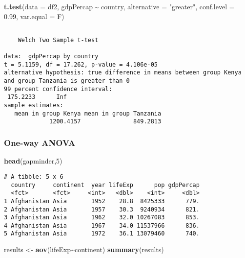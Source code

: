 \documentclass[
]{article}
\newenvironment{Shaded}{\begin{snugshade}}{\end{snugshade}}
\newcommand{\AttributeTok}[1]{\textcolor[rgb]{0.13,0.29,0.53}{#1}}
\newcommand{\DecValTok}[1]{\textcolor[rgb]{0.00,0.00,0.81}{#1}}
\newcommand{\FloatTok}[1]{\textcolor[rgb]{0.00,0.00,0.81}{#1}}
\newcommand{\FunctionTok}[1]{\textcolor[rgb]{0.13,0.29,0.53}{\textbf{#1}}}
\newcommand{\NormalTok}[1]{#1}
\newcommand{\OtherTok}[1]{\textcolor[rgb]{0.56,0.35,0.01}{#1}}
\newcommand{\SpecialCharTok}[1]{\textcolor[rgb]{0.81,0.36,0.00}{\textbf{#1}}}
\newcommand{\StringTok}[1]{\textcolor[rgb]{0.31,0.60,0.02}{#1}}
\begin{document}
\begin{Shaded}
\begin{Highlighting}[]
\FunctionTok{t.test}\NormalTok{(}\AttributeTok{data =}\NormalTok{ df2, gdpPercap }\SpecialCharTok{\textasciitilde{}}\NormalTok{ country, }\AttributeTok{alternative =} \StringTok{"greater"}\NormalTok{, }\AttributeTok{conf.level =} \FloatTok{0.99}\NormalTok{, }\AttributeTok{var.equal =}\NormalTok{ F)}
\end{Highlighting}
\end{Shaded}

\begin{verbatim}

    Welch Two Sample t-test

data:  gdpPercap by country
t = 5.1159, df = 17.262, p-value = 4.106e-05
alternative hypothesis: true difference in means between group Kenya and group Tanzania is greater than 0
99 percent confidence interval:
 175.2233      Inf
sample estimates:
   mean in group Kenya mean in group Tanzania 
             1200.4157               849.2813 
\end{verbatim}

\hypertarget{one-way-anova}{%
\subsubsection{One-way ANOVA}\label{one-way-anova}}

\begin{Shaded}
\begin{Highlighting}[]
\FunctionTok{head}\NormalTok{(gapminder,}\DecValTok{5}\NormalTok{)}
\end{Highlighting}
\end{Shaded}

\begin{verbatim}
# A tibble: 5 x 6
  country     continent  year lifeExp      pop gdpPercap
  <fct>       <fct>     <int>   <dbl>    <int>     <dbl>
1 Afghanistan Asia       1952    28.8  8425333      779.
2 Afghanistan Asia       1957    30.3  9240934      821.
3 Afghanistan Asia       1962    32.0 10267083      853.
4 Afghanistan Asia       1967    34.0 11537966      836.
5 Afghanistan Asia       1972    36.1 13079460      740.
\end{verbatim}

\begin{Shaded}
\begin{Highlighting}[]
\NormalTok{results }\OtherTok{\textless{}{-}} \FunctionTok{aov}\NormalTok{(lifeExp}\SpecialCharTok{\textasciitilde{}}\NormalTok{continent)}
\FunctionTok{summary}\NormalTok{(results)}
\end{Highlighting}
\end{Shaded}
\end{document}
